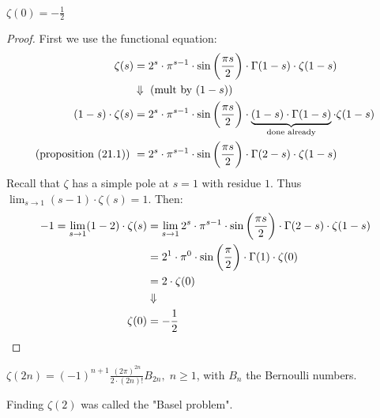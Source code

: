 



\begin{corollary}
$\zeta(0) = - \frac{1}{2}$
\end{corollary}

\begin{proof}
First we use the functional equation:
\begin{align*}
    \zeta(s) &= 2^s \cdot \pi^{s-1} \cdot \sin\left( \frac{\pi s}{2} \right) \cdot \Gamma(1-s) \cdot \zeta(1-s)\\
    &\Downarrow \text{ (mult by $(1-s)$)}\\
    (1-s)\cdot \zeta(s) &= 2^s \cdot \pi^{s-1} \cdot \sin\left( \frac{\pi s}{2} \right) \cdot \underbrace{(1-s)\cdot \Gamma(1-s)}_{\text{done already}} \cdot \zeta(1-s)\\
    \text{(proposition (21.1)) } &= 2^s \cdot \pi^{s-1} \cdot \sin\left( \frac{\pi s}{2} \right) \cdot \Gamma(2-s) \cdot \zeta(1-s)
\end{align*}
Recall that $\zeta$ has a simple pole at $s=1$ with residue $1$. Thus $\lim_{s\to 1} (s-1)\cdot \zeta(s) = 1$. Then:
\begin{align*}
    -1 = \lim_{s\to 1} (1-2)\cdot \zeta(s) &= \lim_{s\to 1} 2^s \cdot \pi^{s-1} \cdot \sin\left( \frac{\pi s}{2} \right) \cdot \Gamma(2-s) \cdot \zeta(1-s)\\
    & = 2^1 \cdot \pi^0 \cdot \sin\left( \frac{\pi}{2} \right) \cdot \Gamma(1) \cdot \zeta(0)\\
    &= 2 \cdot  \zeta(0)\\
    &\Downarrow\\
    \zeta(0) &= - \frac{1}{2}
\end{align*}
\end{proof}

\begin{corollary}
$\zeta(2n) =(-1)^{n+1} \frac{(2\pi)^{2n}}{2 \cdot (2n)!} B_{2n}, \; n \geq 1$, with $B_n$ the Bernoulli numbers.
\end{corollary}

\begin{note}
Finding $\zeta(2)$ was called the "Basel problem".
\end{note}

